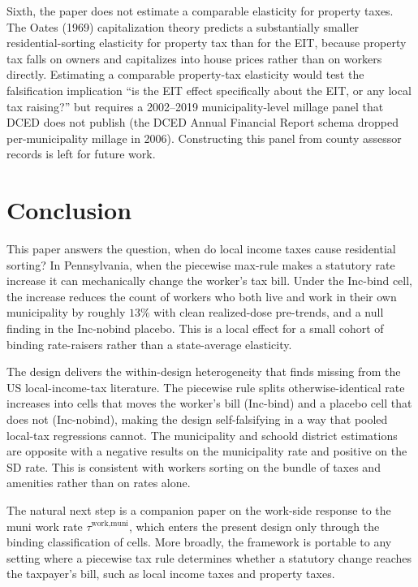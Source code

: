 \documentclass[12pt]{article}
\begin{document}
Sixth, the paper does not estimate a comparable elasticity for property taxes. The Oates (1969) capitalization theory predicts a
substantially smaller residential-sorting elasticity for property
tax than for the EIT, because property tax falls on owners and
capitalizes into house prices rather than on workers directly.
Estimating a comparable property-tax elasticity would test the
falsification implication ``is the EIT effect specifically about the
EIT, or any local tax raising?'' but requires a 2002--2019 municipality-level
millage panel that DCED does not publish (the DCED Annual Financial Report schema dropped per-municipality
millage in 2006). Constructing this panel from county assessor
records is left for future work.

\section{Conclusion}
\label{sec:conclusion}

This paper answers the question, when do local income taxes cause residential sorting? In
Pennsylvania, when the piecewise max-rule makes a statutory rate
increase it can mechanically change the worker's tax bill. Under the Inc-bind cell, the
increase reduces the count of workers who both live and work in
their own municipality by roughly $13\%$
with clean realized-dose pre-trends, and a
null finding in the Inc-nobind placebo. This is a local effect for a small
cohort of binding rate-raisers rather than a state-average
elasticity.

The design delivers the within-design heterogeneity that
\citet{agrawalLessonsStateLocal} finds missing from the US
local-income-tax literature. The piecewise rule splits
otherwise-identical rate increases into cells that moves the
worker's bill (Inc-bind) and a placebo cell that does not
(Inc-nobind), making the design self-falsifying in a way that
pooled local-tax regressions cannot. The municipality and schoold district estimations are opposite with a negative results on the municipality rate and positive on the SD rate. This is
consistent with workers sorting on the bundle of taxes and
amenities rather than on rates alone.


The natural next step is a companion paper on the work-side
response to the muni work rate $\tau^{\text{work,muni}}$, which
enters the present design only through the binding classification
of cells. More broadly, the framework is portable to any setting
where a piecewise tax rule determines whether a statutory change
reaches the taxpayer's bill, such as local income taxes and property taxes.
\end{document}
